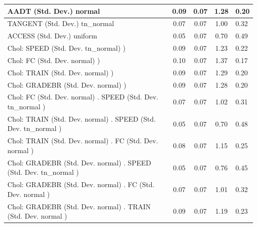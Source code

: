 \begin{table}
\begin{center}
\begin{tabular}{|l|l|c|c|c|l|}
			\hline
			AADT (Std. Dev.) normal &  & 0.09 & 0.07 & 1.28 & 0.20 \\
			\hline
			TANGENT (Std. Dev.) tn_normal &  & 0.07 & 0.07 & 1.00 & 0.32 \\
			\hline
			ACCESS (Std. Dev.) uniform &  & 0.05 & 0.07 & 0.70 & 0.49 \\
			\hline
			 Chol: SPEED (Std. Dev. tn_normal) ) &  & 0.09 & 0.07 & 1.23 & 0.22 \\
			\hline
			 Chol: FC (Std. Dev. normal) ) &  & 0.10 & 0.07 & 1.37 & 0.17 \\
			\hline
			 Chol: TRAIN (Std. Dev. normal) ) &  & 0.09 & 0.07 & 1.29 & 0.20 \\
			\hline
			 Chol: GRADEBR (Std. Dev. normal) ) &  & 0.09 & 0.07 & 1.28 & 0.20 \\
			\hline
			 Chol: FC (Std. Dev. normal) . SPEED (Std. Dev.   tn_normal ) &  & 0.07 & 0.07 & 1.02 & 0.31 \\
			\hline
			 Chol: TRAIN (Std. Dev. normal) . SPEED (Std. Dev.   tn_normal ) &  & 0.05 & 0.07 & 0.70 & 0.48 \\
			\hline
			 Chol: TRAIN (Std. Dev. normal) . FC (Std. Dev.   normal ) &  & 0.08 & 0.07 & 1.15 & 0.25 \\
			\hline
			 Chol: GRADEBR (Std. Dev. normal) . SPEED (Std. Dev.   tn_normal ) &  & 0.05 & 0.07 & 0.76 & 0.45 \\
			\hline
			 Chol: GRADEBR (Std. Dev. normal) . FC (Std. Dev.   normal ) &  & 0.07 & 0.07 & 1.01 & 0.32 \\
			\hline
			 Chol: GRADEBR (Std. Dev. normal) . TRAIN (Std. Dev.   normal ) &  & 0.09 & 0.07 & 1.19 & 0.23 \\
			\hline
		\end{tabular}
	\end{center}
\end{table}